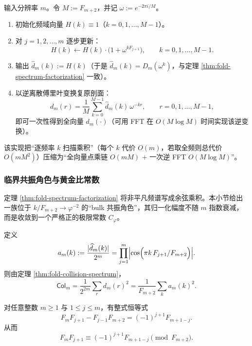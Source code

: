 \begin{algorithm}\label{alg:fold-multiplicity-fft}
输入分辨率 \(m\)。令 \(M:=F_{m+2}\)，并记 \(\omega:=e^{-2\pi i/M}\)。
\begin{enumerate}
  \item 初始化频域向量 \(H(k)\equiv 1\)（\(k=0,1,\dots,M-1\)）。
  \item 对 \(j=1,2,\dots,m\) 逐步更新：
  \[
  H(k)\leftarrow H(k)\cdot \bigl(1+\omega^{kF_{j+1}}\bigr),\qquad k=0,1,\dots,M-1.
  \]
  \item 输出 \(\widehat d_m(k):=H(k)\)（于是 \(\widehat d_m(k)=D_m(\omega^k)\)，与定理 \ref{thm:fold-spectrum-factorization} 一致）。
  \item 以逆离散傅里叶变换复原剖面：
  \[
  d_m(r)=\frac{1}{M}\sum_{k=0}^{M-1}\widehat d_m(k)\,\omega^{-kr},
  \qquad r=0,1,\dots,M-1,
  \]
  即可一次性得到全向量 \(d_m(\cdot)\)（可用 FFT 在 \(O(M\log M)\) 时间实现该逆变换）。
\end{enumerate}
该实现把“逐频率 \(k\) 扫描乘积”（每个 \(k\) 代价 \(O(m)\)，若取全频则总代价 \(O(mM^2)\)）压缩为“全向量点乘链 \(O(mM)\) + 一次逆 FFT \(O(M\log M)\)”。
\end{algorithm}

\subsubsection{临界共振角色与黄金比常数}
\label{subsubsec:fold-critical-resonance}

定理 \ref{thm:fold-spectrum-factorization} 将非平凡频谱写成余弦乘积。本小节给出一族位于
\(
k/F_{m+2}\to \varphi^{-2}
\)
的“bulk 共振角色”，其归一化幅度不随 $m$ 指数衰减，而是收敛到一个严格正的极限常数 \(C_\varphi\)。

\begin{definition}[归一化频谱幅度]\label{def:fold-normalized-amplitude}
定义
\[
a_m(k):=\frac{|\widehat d_m(k)|}{2^m}
=\prod_{j=1}^m\Bigl|\cos\Bigl(\pi k\,F_{j+1}/F_{m+2}\Bigr)\Bigr|.
\]
则由定理 \ref{thm:fold-collision-spectrum}，
\[
\mathsf{Col}_m
=\frac{1}{2^{2m}}\sum_r d_m(r)^2
=\frac{1}{F_{m+2}}\sum_{k} a_m(k)^2.
\]
\end{definition}

\begin{lemma}\label{lem:fold-resonance-docagne}
对任意整数 \(m\ge 1\) 与 \(1\le j\le m\)，有整式恒等式
\[
F_mF_{j+1}-F_{j-1}F_{m+2}=(-1)^{j+1}F_{m+1-j}.
\]
从而
\[
F_mF_{j+1}\equiv (-1)^{j+1}F_{m+1-j}\pmod{F_{m+2}}.
\]
\end{lemma}

